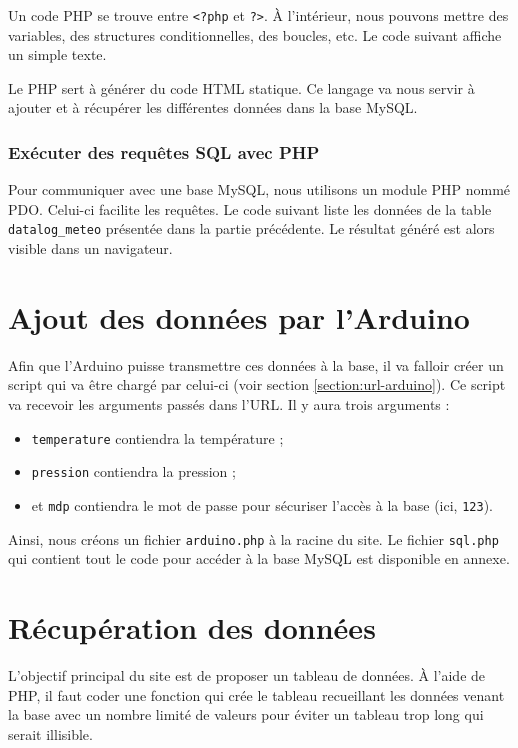 Un code PHP se trouve entre \verb-<?php- et \verb-?>-. À l'intérieur, nous pouvons mettre des variables, des structures conditionnelles, des boucles, etc. Le code suivant affiche un simple texte.

Le PHP sert à générer du code HTML statique. Ce langage va nous servir à ajouter et à récupérer les différentes données dans la base MySQL.

\subsubsection{Exécuter des requêtes SQL avec PHP}

Pour communiquer avec une base MySQL, nous utilisons un module PHP nommé PDO. Celui-ci facilite les requêtes. Le code suivant liste les données de la table \verb-datalog_meteo- présentée dans la partie précédente.
Le résultat généré est alors visible dans un navigateur.

\section{Ajout des données par l'Arduino}
\label{section:script-arduino}

Afin que l'Arduino puisse transmettre ces données à la base, il va falloir créer un script qui va être chargé par celui-ci (voir section \ref{section:url-arduino}). Ce script va recevoir les arguments passés dans l'URL. Il y aura trois arguments :
\begin{itemize}
	\item \verb-temperature- contiendra la température ;
	\item \verb-pression- contiendra la pression ;
	\item et \verb-mdp- contiendra le mot de passe pour sécuriser l'accès à la base (ici, \verb-123-).
\end{itemize}
Ainsi, nous créons un fichier \verb-arduino.php- à la racine du site. Le fichier \verb-sql.php- qui contient tout le code pour accéder à la base MySQL est disponible en annexe.

\section{Récupération des données}

L'objectif principal du site est de proposer un tableau de données. À l'aide de PHP, il faut coder une fonction qui crée le tableau recueillant les données venant la base avec un nombre limité de valeurs pour éviter un tableau trop long qui serait illisible.

